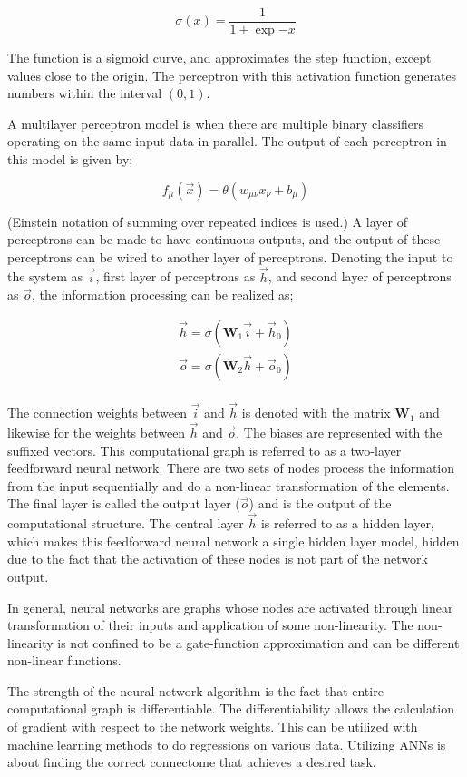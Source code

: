 \documentclass[../dissertation.tex]{subfiles}
\begin{document}
\begin{equation}
    \sigma(x) = \frac{1}{1 + \exp{-x}}
\end{equation}

The function is a sigmoid curve, and approximates the step function, except values close to the origin.
The perceptron with this activation function generates numbers within the interval $(0, 1)$.

A multilayer perceptron model is when there are multiple binary classifiers operating on the same input data in parallel.
The output of each perceptron in this model is given by;

\begin{equation}
   f_{\mu} (\vec{x}) = \theta(w_{\mu\nu}x_{\nu} + b_{\mu})
\end{equation}

(Einstein notation of summing over repeated indices is used.)
A layer of perceptrons can be made to have continuous outputs, and the output of these perceptrons can be wired to another layer of perceptrons.
Denoting the input to the system as $\vec{i}$, first layer of perceptrons as $\vec{h}$, and second layer of perceptrons as $\vec{o}$, the information processing can be realized as;

\begin{equation} \begin{split}
    \vec{h} = \sigma \left( \mathbf{W}_1 \vec{i} + \vec{h}_{0} \right) \\
    \vec{o} = \sigma \left( \mathbf{W}_2 \vec{h} + \vec{o}_{0} \right) \\
\end{split} \end{equation}

The connection weights between $\vec{i}$ and $\vec{h}$ is denoted with the matrix $\mathbf{W}_1$ and likewise for the weights between $\vec{h}$ and $\vec{o}$.
The biases are represented with the suffixed vectors.
This computational graph is referred to as a two-layer feedforward neural network.
There are two sets of nodes process the information from the input sequentially and do a non-linear transformation of the elements.
The final layer is called the output layer ($\vec{o}$) and is the output of the computational structure.
The central layer $\vec{h}$ is referred to as a hidden layer, which makes this feedforward neural network a single hidden layer model, hidden due to the fact that the activation of these nodes is not part of the network output.

In general, neural networks are graphs whose nodes are activated through linear transformation of their inputs and application of some non-linearity.
The non-linearity is not confined to be a gate-function approximation and can be different non-linear functions.

The strength of the neural network algorithm is the fact that entire computational graph is differentiable.
The differentiability allows the calculation of gradient with respect to the network weights.
This can be utilized with machine learning methods to do regressions on various data.
Utilizing ANNs is about finding the correct connectome that achieves a desired task.
\end{document}
